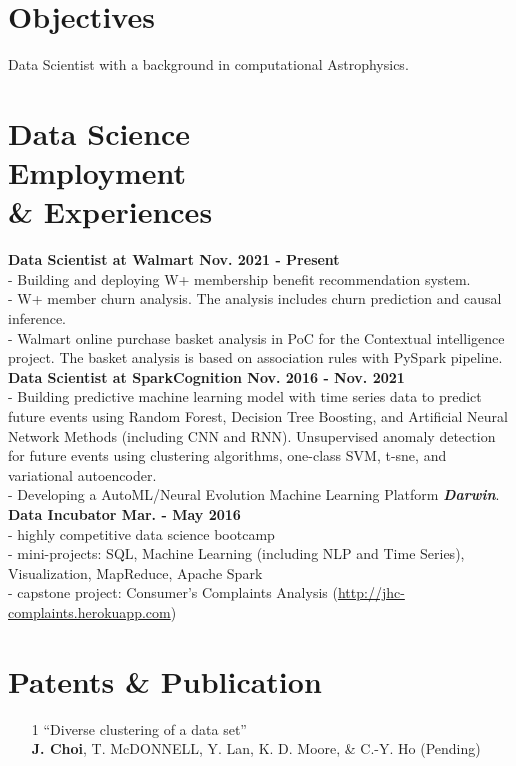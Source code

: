\documentclass[margin,centered]{res}
\begin{document}
\begin{resume}

\vspace{-0.0cm}
\section{Objectives} Data Scientist with a background in computational Astrophysics.


\section{Data Science \\ Employment \\ \& Experiences}
{\bf Data Scientist at Walmart Nov. 2021 - Present} \\
- Building and deploying W+ membership benefit recommendation system.\\
- W+ member churn analysis. The analysis includes churn prediction and causal inference.\\
- Walmart online purchase basket analysis in PoC for the Contextual intelligence project. The basket analysis is based on association rules with PySpark pipeline.\\
{\bf Data Scientist at SparkCognition Nov. 2016 - Nov. 2021} \\
- Building predictive machine learning model with time series data to predict future events using Random Forest, Decision Tree Boosting, and Artificial Neural Network Methods (including CNN and RNN). Unsupervised anomaly detection for future events using clustering algorithms, one-class SVM, t-sne, and variational autoencoder. \\
- Developing a AutoML/Neural Evolution Machine Learning Platform {\bf {\it Darwin}}.\\
{\bf Data Incubator Mar. - May 2016}  \\
- highly competitive data science bootcamp \\
- mini-projects: SQL, Machine Learning (including NLP and Time Series), Visualization, MapReduce, Apache Spark \\
- capstone project: Consumer's Complaints Analysis ({\scriptsize \url{http://jhc-complaints.herokuapp.com}})\\

\section{Patents \& Publication}
\begin{enumerate}
\item[1] ``Diverse clustering of a data set'' \\ \textbf{J. Choi}, T. McDONNELL, Y. Lan, K. D. Moore, \& C.-Y. Ho (Pending)


\end{enumerate}
\end{resume}
\end{document}
